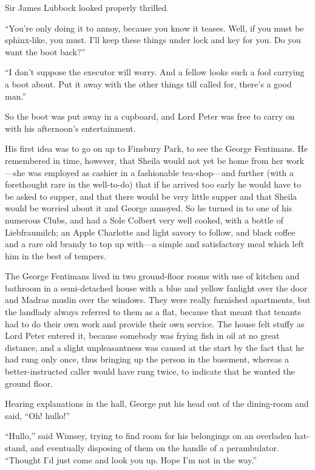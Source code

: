 Sir James Lubbock looked properly thrilled.

\enquote{You're only doing it to annoy, because you know it teases. Well, if you must be sphinx-like, you must. I'll keep these things under lock and key for you. Do you want the boot back?}

\enquote{I don't suppose the executor will worry. And a fellow looks such a fool carrying a boot about. Put it away with the other things till called for, there's a good man.}

So the boot was put away in a cupboard, and Lord Peter was free to carry on with his afternoon's entertainment.

His first idea was to go on up to Finsbury Park, to see the George Fentimans. He remembered in time, however, that Sheila would not yet be home from her work\allowbreak---\allowbreak she was employed as cashier in a fashionable tea-shop\allowbreak---\allowbreak and further (with a forethought rare in the well-to-do) that if he arrived too early he would have to be asked to supper, and that there would be very little supper and that Sheila would be worried about it and George annoyed. So he turned in to one of his numerous Clubs, and had a Sole Colbert very well cooked, with a bottle of Liebfraumilch; an Apple Charlotte and light savory to follow, and black coffee and a rare old brandy to top up with\allowbreak---\allowbreak a simple and satisfactory meal which left him in the best of tempers.

The George Fentimans lived in two ground-floor rooms with use of kitchen and bathroom in a semi-detached house with a blue and yellow fanlight over the door and Madras muslin over the windows. They were really furnished apartments, but the landlady always referred to them as a flat, because that meant that tenants had to do their own work and provide their own service. The house felt stuffy as Lord Peter entered it, because somebody was frying fish in oil at no great distance, and a slight unpleasantness was caused at the start by the fact that he had rung only once, thus bringing up the person in the basement, whereas a better-instructed caller would have rung twice, to indicate that he wanted the ground floor.

Hearing explanations in the hall, George put his head out of the dining-room and said, \enquote{Oh! hullo!}

\enquote{Hullo,} said Wimsey, trying to find room for his belongings on an overladen hat-stand, and eventually disposing of them on the handle of a perambulator. \enquote{Thought I'd just come and look you up. Hope I'm not in the way.}

